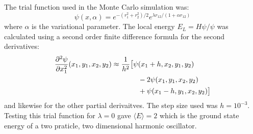 \documentclass[twocolumn]{article}
\begin{document}
\begin{large}
The trial function used in the Monte Carlo simulation was:
\begin{equation}
    \psi(x,\alpha) = e^{-(r_1^2+r_2^2)/2}e^{\lambda r_{12}/(1+\alpha r_{12})}
\end{equation}
where $\alpha$ is the variational parameter. The local energy $E_L=H\psi/\psi$ was calculated using a second order finite difference formula for the second derivatives:
\begin{equation}
    \begin{split}
        \frac{\partial^2\psi}{\partial x_1^2}(x_1,y_1,x_2,y_2) &\approx \frac{1}{h^2}\big[\psi(x_1+h,x_2,y_1,y_2) \\ 
        &\hspace{1.3cm}-2\psi(x_1,y_1,x_2,y_2) \\ 
        &\hspace{1.3cm}+\psi(x_1-h,y_1,x_2,y_2) \big]
    \end{split}
\end{equation}
and likewise for the other partial derivaitves. The step size used was $h=10^{-3}$. Testing this trial function for $\lambda=0$ gave $\langle E\rangle = 2$ which is the ground state energy of a two praticle, two dimensional harmonic oscillator. 


\end{large}
\end{document}
